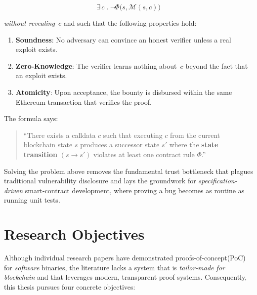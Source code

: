     \[
      \exists\,c \;.\; \lnot\Phi\bigl(s,\mathcal{M}(s,c)\bigr)
    \]

\textit{without revealing~$c$} and such that the following properties hold:

\begin{enumerate}[label=\textit{(\alph*)}]
    \item \textbf{Soundness}: No adversary can convince an honest verifier unless a real exploit exists.
    \item \textbf{Zero-Knowledge}: The verifier learns nothing about~$c$ beyond the fact that an exploit exists.
    \item \textbf{Atomicity}: Upon acceptance, the bounty is disbursed within the same Ethereum transaction that verifies the proof.

\end{enumerate}

The formula says:

\begin{quote}
    “There exists a calldata $c$ such that executing $c$ from the current blockchain state $s$ produces a successor state $s'$ where the \textbf{state transition} $(s \!\to\! s')$ violates at least one contract rule $\Phi$.”
\end{quote}

Solving the problem above removes the fundamental trust bottleneck that plagues traditional vulnerability disclosure and lays the groundwork for \textit{specification-driven} smart-contract development, where proving a bug becomes as routine as running unit tests.

\section{Research Objectives}
Although individual research papers have demonstrated proofs‑of‑concept(PoC) for \textit{software} binaries, the literature lacks a system that is \textit{tailor‑made for blockchain} and that leverages modern, transparent proof systems.  
Consequently, this thesis pursues four concrete objectives:

